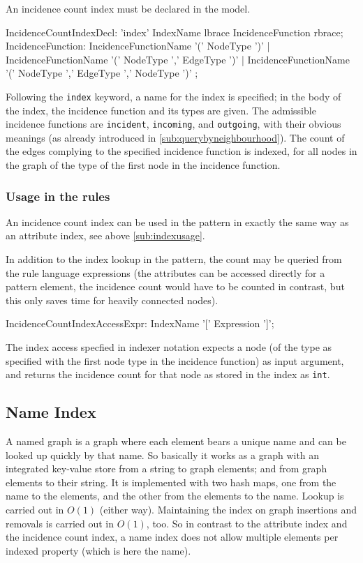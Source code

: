 An incidence count index must be declared in the model.

\begin{rail}
IncidenceCountIndexDecl: 'index' IndexName lbrace IncidenceFunction rbrace;
IncidenceFunction: 
  IncidenceFunctionName '(' NodeType ')' |
  IncidenceFunctionName '(' NodeType ',' EdgeType ')' |
  IncidenceFunctionName '(' NodeType ',' EdgeType ',' NodeType ')'
  ;
\end{rail}\label{IncidenceCountIndexDecl}

Following the \texttt{index} keyword, a name for the index is specified; in the body of the index, the incidence function and its types are given.
The admissible incidence functions are \texttt{incident}, \texttt{incoming}, and \texttt{outgoing}, with their obvious meanings (as already introduced in \ref{sub:querybyneighbourhood}).
The count of the edges complying to the specified incidence function is indexed, for all nodes in the graph of the type of the first node in the incidence function.

\subsubsection*{Usage in the rules}
An incidence count index can be used in the pattern in exactly the same way as an attribute index, see above \ref{sub:indexusage}.

In addition to the index lookup in the pattern, 
the count may be queried from the rule language expressions (the attributes can be accessed directly for a pattern element, the incidence count would have to be counted in contrast, but this only saves time for heavily connected nodes).

\begin{rail}
  IncidenceCountIndexAccessExpr:
    IndexName '[' Expression ']';
\end{rail}

The index access specfied in indexer notation expects a node (of the type as specified with the first node type in the incidence function) as input argument, and returns the incidence count for that node as stored in the index as \texttt{int}.

\subsection{Name Index}\label{sec:nameindex}
A named graph is a graph where each element bears a unique name and can be looked up quickly by that name.
So basically it works as a graph with an integrated key-value store from a string to graph elements; and from graph elements to their string.
It is implemented with two hash maps, one from the name to the elements, and the other from the elements to the name.
Lookup is carried out in $O(1)$ (either way).
Maintaining the index on graph insertions and removals is carried out in $O(1)$, too.
So in contrast to the attribute index and the incidence count index, a name index does not allow multiple elements per indexed property (which is here the name).

